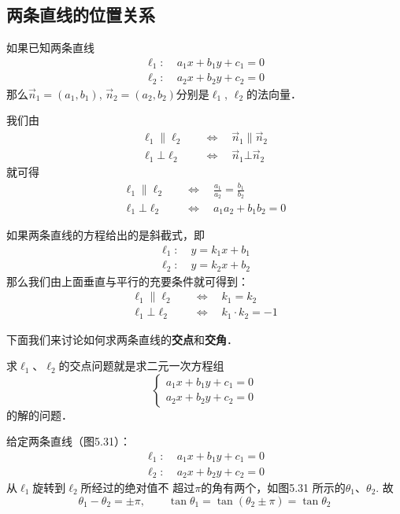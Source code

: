 \subsection{两条直线的位置关系}
如果已知两条直线
\[\begin{split}
  \ell_1:&\; a_1x+b_1y+c_1=0\\
  \ell_2:&\; a_2x+b_2y+c_2=0  
\end{split}\]
那么$\vec{n}_1=(a_1,b_1)$, $\vec{n}_2=(a_2,b_2)$分别是$\ell_1$, $\ell_2$的法向量．

我们由
\[\begin{split}
    \ell_1\parallel \ell_2 \quad &\Longleftrightarrow\quad \vec{n}_1\parallel \vec{n}_2\\
    \ell_1\bot \ell_2 \quad &\Longleftrightarrow\quad \vec{n}_1\bot \vec{n}_2
\end{split}\]
就可得
\[\begin{split}
    \ell_1\parallel \ell_2 \quad &\Longleftrightarrow\quad \frac{a_1}{a_2}=\frac{b_1}{b_2}\\
    \ell_1\bot \ell_2 \quad &\Longleftrightarrow\quad a_1a_2+b_1b_2=0
   \end{split} 
\]

如果两条直线的方程给出的是斜截式，即
\[\begin{split}
    \ell_1:&\; y=k_1x+b_1\\
    \ell_2:&\; y=k_2x+b_2 
  \end{split}\]
那么我们由上面垂直与平行的充要条件就可得到：
\[\begin{split}
    \ell_1\parallel \ell_2 \quad &\Longleftrightarrow\quad k_1=k_2\\
    \ell_1\bot \ell_2 \quad &\Longleftrightarrow\quad k_1\cdot k_2=-1
   \end{split} 
\]

下面我们来讨论如何求两条直线的\textbf{交点}和\textbf{交角}．

求$\ell_1$、$\ell_2$的交点问题就是求二元一次方程组
\[\begin{cases}
    a_1x+b_1y+c_1=0\\
a_2x+b_2y+c_2=0
\end{cases}\]
的解的问题．

给定两条直线（图5.31）：
\[\begin{split}
    \ell_1:&\; a_1x+b_1y+c_1=0\\
    \ell_2:&\; a_2x+b_2y+c_2=0
  \end{split}\]
从$\ell_1$旋转到$\ell_2$所经过的绝对值不
超过$\pi$的角有两个，如图5.31
所示的$\theta_1$、$\theta_2$. 故
\[\theta_1-\theta_2=\pm \pi,\qquad \tan\theta_1=\tan(\theta_2\pm \pi)=\tan\theta_2\]

